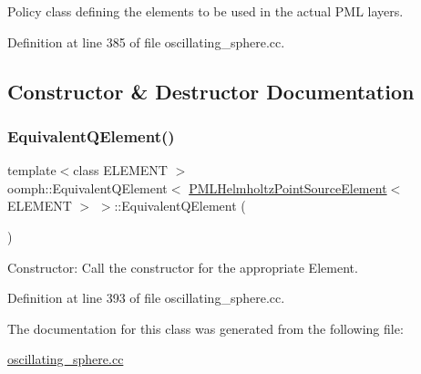 Policy class defining the elements to be used in the actual P\+ML layers. 

Definition at line 385 of file oscillating\+\_\+sphere.\+cc.



\subsection{Constructor \& Destructor Documentation}
\mbox{\label{classoomph_1_1EquivalentQElement_3_01PMLHelmholtzPointSourceElement_3_01ELEMENT_01_4_01_4_af5fac6bf3394d799567523c3851288f2}} 
\subsubsection{\texorpdfstring{Equivalent\+Q\+Element()}{EquivalentQElement()}}
{\footnotesize\ttfamily template$<$class E\+L\+E\+M\+E\+NT $>$ \\
oomph\+::\+Equivalent\+Q\+Element$<$ \hyperlink{classoomph_1_1PMLHelmholtzPointSourceElement}{P\+M\+L\+Helmholtz\+Point\+Source\+Element}$<$ E\+L\+E\+M\+E\+NT $>$ $>$\+::Equivalent\+Q\+Element (\begin{DoxyParamCaption}{ }\end{DoxyParamCaption})\hspace{0.3cm}{\ttfamily [inline]}}



Constructor\+: Call the constructor for the appropriate Element. 



Definition at line 393 of file oscillating\+\_\+sphere.\+cc.



The documentation for this class was generated from the following file\+:\begin{DoxyCompactItemize}
\item 
\hyperlink{oscillating__sphere_8cc}{oscillating\+\_\+sphere.\+cc}\end{DoxyCompactItemize}
